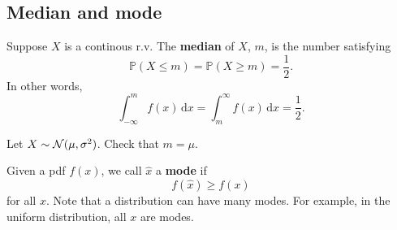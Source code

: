 \subsection{Median and mode}
\begin{definition}
    Suppose $X$ is a continous r.v. The \textbf{median} of $X$, $m$, is the number satisfying 
    \[
        \mathbb{P}(X\le m)=\mathbb{P}(X\ge m)=\frac{1}{2}.
    \]
    In other words,
    \[
        \int_{-\infty}^{m} f(x) \,\mathrm{d}x=\int_{m}^{\infty} f(x) \,\mathrm{d}x = \frac{1}{2}.
    \]
\end{definition}
\begin{example}
    Let $ X \sim {\mathcal{N}}(\mu,\sigma^2) $. Check that $ m=\mu $.
\end{example}
\begin{definition}[Mode]
    Given a pdf $f(x)$, we call $\hat x$ a \textbf{mode} if
    \[
        f(\hat x) \geq f(x)
    \]
    for all $x$. Note that a distribution can have many modes. For example, in the uniform distribution, all $x$ are modes.
\end{definition}
